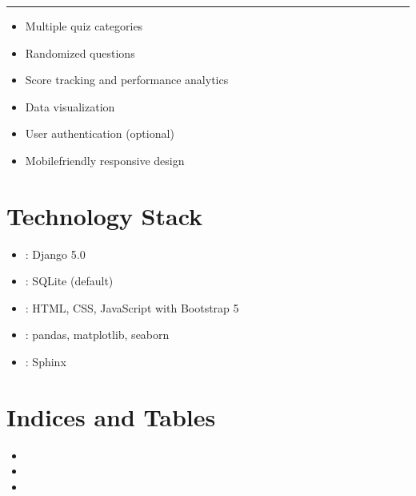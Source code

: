 \documentclass[letterpaper,10pt,english]{sphinxmanual}
\begin{document}
\bigskip\hrule\bigskip

\begin{itemize}
\item {} 
\sphinxAtStartPar
Multiple quiz categories

\item {} 
\sphinxAtStartPar
Randomized questions

\item {} 
\sphinxAtStartPar
Score tracking and performance analytics

\item {} 
\sphinxAtStartPar
Data visualization

\item {} 
\sphinxAtStartPar
User authentication (optional)

\item {} 
\sphinxAtStartPar
Mobile\sphinxhyphen{}friendly responsive design

\end{itemize}


\chapter{Technology Stack}
\label{\detokenize{index:technology-stack}}\begin{itemize}
\item {} 
\sphinxAtStartPar
{}: Django 5.0

\item {} 
\sphinxAtStartPar
{}: SQLite (default)

\item {} 
\sphinxAtStartPar
{}: HTML, CSS, JavaScript with Bootstrap 5

\item {} 
\sphinxAtStartPar
{}: pandas, matplotlib, seaborn

\item {} 
\sphinxAtStartPar
{}: Sphinx

\end{itemize}


\chapter{Indices and Tables}
\label{\detokenize{index:indices-and-tables}}\begin{itemize}
\item {} 
\sphinxAtStartPar
{}

\item {} 
\sphinxAtStartPar
{}

\item {} 
\sphinxAtStartPar
{}

\end{itemize}



\renewcommand{\indexname}{Index}
\printindex
\end{document}
